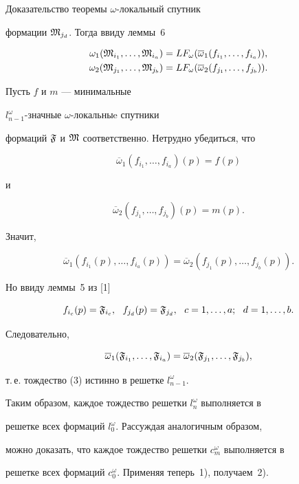 \begin{pf*}{Доказательство теоремы}
$\omega$-локальный спутник


формации $\frak{M}_{j_d}$. Тогда ввиду леммы~6


\begin{align*}


\omega_1(\frak{M}_{i_1},\dotsc,\frak{M}_{i_a})&=LF_{\omega}


(\overline{\omega}_1(f_{i_1},\dotsc,f_{i_a})), \\


\omega_2(\frak{M}_{j_1},\dotsc,\frak{M}_{j_b})&=LF_{\omega}


(\overline{\omega}_2(f_{j_1},\dotsc,f_{j_b})).


\end{align*}


Пусть $f$ и $m$ --- минимальные


$l^{\omega}_{n-1}$-значные $\omega$-локальныe спутники


формаций $\frak{F}$ и $\frak{M}$ соответственно. Нетрудно убедиться, что


$$


\overline{\omega}_1(f_{i_1},\dotsc,f_{i_a})(p)=f(p)


$$


и


$$


\overline{\omega}_2(f_{j_1},\dotsc,f_{j_b})(p)=m(p).


$$


Значит,


$$


\overline{\omega}_1(f_{i_1}(p),\dotsc,f_{i_a}(p))=


\overline{\omega}_2(f_{j_1}(p),\dotsc,f_{j_b}(p)).


$$


Но ввиду леммы~5 из [1]


$$


f_{i_c}(p)=\frak{F}_{i_c},\ \ f_{j_d}(p)=\frak{F}_{j_d},


\ \ c=1,\dotsc,a;\ \ d=1,\dotsc,b.


$$


Следовательно,


$$


\overline{\omega}_1(\frak{F}_{i_1},\dotsc,


\frak{F}_{i_a})=\overline{\omega}_2(\frak{F}_{j_1},\dotsc,\frak{F}_{j_b}),


$$


т.\,е. тождество (3) истинно в решетке $l_{n-1}^{\omega}$.


Таким образом, каждое тождество решетки $l_{n}^{\omega}$ выполняется в


решетке всех формаций $l_{0}^{\omega}$. Рассуждая аналогичным образом,


можно доказать, что каждое тождество решетки $c_m^{\omega}$ выполняется в


решетке всех формаций $c_0^{\omega}$. Применяя теперь~1), получаем~2).


\end{pf*}





